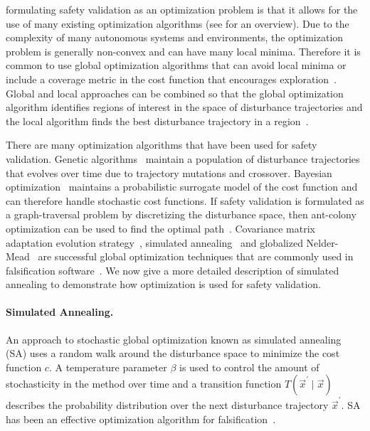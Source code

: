 formulating safety validation as an optimization problem is that it allows for the use of many existing optimization algorithms (see \textcite{kochenderfer2019algorithms} for an overview). Due to the complexity of many autonomous systems and environments, the optimization problem is generally non-convex and can have many local minima. Therefore it is common to use global optimization algorithms that can avoid local minima or include a coverage metric in the cost function that encourages exploration~\cite{esposito2004adaptive,Nahhal2007Test,dokhanchi2015requirements}. Global and local approaches can be combined so that the global optimization algorithm identifies regions of interest in the space of disturbance trajectories and the local algorithm finds the best disturbance trajectory in a region~\cite{deshmukh2015stochastic,adimoolam2017classification, yaghoubi2019gray,Mathesen2019falsification}.

There are many optimization algorithms that have been used for safety validation. Genetic algorithms~\cite{zhao2003generating,zou2014safety} maintain a population of disturbance trajectories that evolves over time due to trajectory mutations and crossover. Bayesian optimization~\cite{akazaki2017causality, silvetti2017active, Deshmukh2017testing, mullins2018adaptive, abeysirigoonawardena2019generating,yang2020stress} maintains a probabilistic surrogate model of the cost function and can therefore handle stochastic cost functions. If safety validation is formulated as a graph-traversal problem by discretizing the disturbance space, then ant-colony optimization can be used to find the optimal path~\cite{annapureddy2010ant}. Covariance matrix adaptation evolution strategy~\cite{hansen1996adapting}, simulated annealing~\cite{abbas2013probabilistic} and globalized Nelder-Mead~\cite{luersen2004globalized} are successful global optimization techniques that are commonly used in falsification software~\cite{annapureddy2011staliro,donze2010breach}. We now give a more detailed description of simulated annealing to demonstrate how optimization is used for safety validation.

\paragraph{Simulated Annealing.} An approach to stochastic global optimization known as simulated annealing (SA) uses a random walk around the disturbance space to minimize the cost function $c$. A temperature parameter $\beta$ is used to control the amount of stochasticity in the method over time and a transition function $T(\vec{x}^\prime \mid \vec{x})$ describes the probability distribution over the next disturbance trajectory $\vec{x}^\prime$. SA has been an effective optimization algorithm for falsification~\cite{abbas2013probabilistic,aerts2018temporal}.

